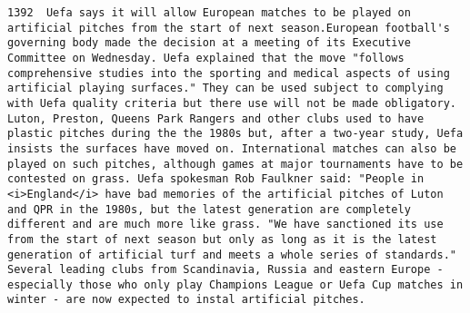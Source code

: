\documentclass[11pt]{article}
\begin{document}
\begin{Verbatim}[commandchars=\\\{\}]
         1392  Uefa says it will allow European matches to be played on artificial pitches from the start of next season.European football's governing body made the decision at a meeting of its Executive Committee on Wednesday. Uefa explained that the move "follows comprehensive studies into the sporting and medical aspects of using artificial playing surfaces." They can be used subject to complying with Uefa quality criteria but there use will not be made obligatory. Luton, Preston, Queens Park Rangers and other clubs used to have plastic pitches during the the 1980s but, after a two-year study, Uefa insists the surfaces have moved on. International matches can also be played on such pitches, although games at major tournaments have to be contested on grass. Uefa spokesman Rob Faulkner said: "People in <i>England</i> have bad memories of the artificial pitches of Luton and QPR in the 1980s, but the latest generation are completely different and are much more like grass. "We have sanctioned its use from the start of next season but only as long as it is the latest generation of artificial turf and meets a whole series of standards." Several leading clubs from Scandinavia, Russia and eastern Europe - especially those who only play Champions League or Uefa Cup matches in winter - are now expected to instal artificial pitches.                                                                                                                                                                                                                                                                                                                                                                                                                                                                                                                                                                                                                                                                                                                                                                                                                                                                                                                                                                                                                                                                                                                                                                                                                                                                                                                                                                                                                                                                                                                                                                                                                                                                                                                                                                                                                                                                                                                                                                                                                                 
\end{Verbatim}
\end{document}
